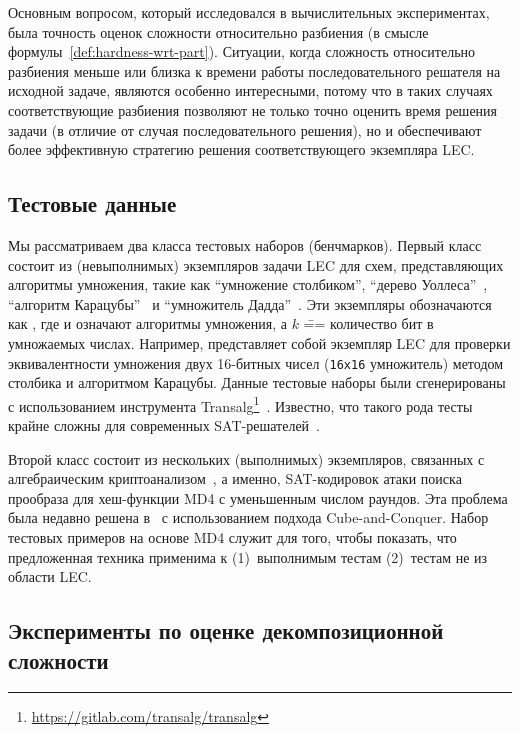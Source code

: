 Основным вопросом, который исследовался в вычислительных экспериментах, была точность оценок сложности относительно разбиения (в смысле формулы~\eqref{def:hardness-wrt-part}).
Ситуации, когда сложность относительно разбиения меньше или близка к времени работы последовательного решателя на исходной задаче, являются особенно интересными, потому что в таких случаях соответствующие разбиения позволяют не только точно оценить время решения задачи (в отличие от случая последовательного решения), но и обеспечивают более эффективную стратегию решения соответствующего экземпляра LEC.



\subsection{Тестовые данные}
\label{sub:partitioning-experiments-benchmarks}

Мы рассматриваем два класса тестовых наборов (бенчмарков).
Первый класс состоит из (невыполнимых) экземпляров задачи LEC для схем, представляющих алгоритмы умножения, такие как
\enquote{умножение столбиком}, \enquote{дерево Уоллеса}~\cite{cormen1990}, \enquote{алгоритм Карацубы}~\cite{knuth-vol2} и \enquote{умножитель Дадда}~\cite{dadda1965}.
Эти экземпляры обозначаются как , где  и  означают алгоритмы умножения, а $k$ \=== количество бит в умножаемых числах.
Например,  представляет собой экземпляр LEC для проверки эквивалентности умножения двух 16-битных чисел (\texttt{16x16} умножитель) методом столбика и алгоритмом Карацубы.
Данные тестовые наборы были сгенерированы с использованием инструмента Transalg\footnote{\url{https://gitlab.com/transalg/transalg}}~\cite{semenov2020}.
Известно, что такого рода тесты крайне сложны для современных SAT-решателей~\cite{kaufmann2019,semenov2021}.

Второй класс состоит из нескольких (выполнимых) экземпляров, связанных с алгебраическим криптоанализом~\cite{bard2009}, а именно, SAT-кодировок атаки поиска прообраза для хеш-функции MD4 с уменьшенным числом раундов.
Эта проблема была недавно решена в~\cite{zaikin2022} с использованием подхода Cube-and-Conquer.
Набор тестовых примеров на основе MD4 служит для того, чтобы показать, что предложенная техника применима к (1)~выполнимым тестам (2)~тестам не из области LEC.


\subsection{Эксперименты по оценке декомпозиционной сложности}
\label{sub:partitioning-experiments-dhardness}

